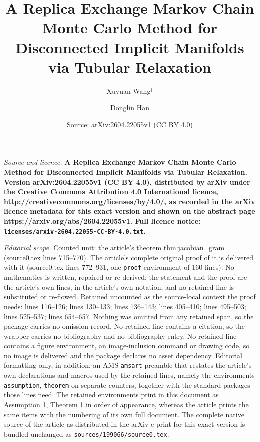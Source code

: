 \documentclass[10pt,a4paper]{amsart}
\title{\bf A Replica Exchange Markov Chain Monte Carlo Method for Disconnected Implicit Manifolds via Tubular Relaxation}
\author{Xuyuan Wang$^{\dagger}$ \and Donglin Han}
\date{Source: arXiv:2604.22055v1 (CC BY 4.0)}
\begin{document}
\maketitle

\noindent\emph{Source and licence.} \bf A Replica Exchange Markov Chain Monte Carlo Method for Disconnected Implicit Manifolds via Tubular Relaxation. Version arXiv:2604.22055v1 (CC BY 4.0), distributed by arXiv under the Creative Commons Attribution 4.0 International licence, http://creativecommons.org/licenses/by/4.0/, as recorded in the arXiv licence metadata for this exact version and shown on the abstract page https://arxiv.org/abs/2604.22055v1. Full licence notice: \texttt{licenses/arxiv-2604.22055-CC-BY-4.0.txt}.\par\smallskip

\noindent\textit{Editorial scope.} Counted unit: the article's theorem thm:jacobian\_gram (source0.tex lines 715--770). The article's complete original proof of it is delivered with it (source0.tex lines 772--931, one \texttt{proof} environment of 160 lines). No mathematics is written, repaired or re-derived: the statement and the proof are the article's own lines, in the article's own notation, and no retained line is substituted or re-flowed.  Retained uncounted as the source-local context the proof needs: lines 116--126; lines 130--133; lines 136--143; lines 405--410; lines 495--503; lines 525--537; lines 654--657.  Nothing was omitted from any retained span, so the package carries no omission record.  No retained line contains a citation, so the wrapper carries no bibliography and no bibliography entry.  No retained line contains a figure environment, an image-inclusion command or drawing code, so no image is delivered and the package declares no asset dependency.  Editorial formatting only, in addition: an AMS \texttt{amsart} preamble that restates the article's own declarations and macros used by the retained lines, namely the environments \texttt{assumption}, \texttt{theorem} on separate counters, together with the standard packages those lines need.  The retained environments print in this document as Assumption 1, Theorem 1 in order of appearance, whereas the article prints the same items with the numbering of its own full document.  The complete native source of the article as distributed in the arXiv e-print for this exact version is bundled unchanged as \texttt{sources/199066/source0.tex}.
\end{document}

